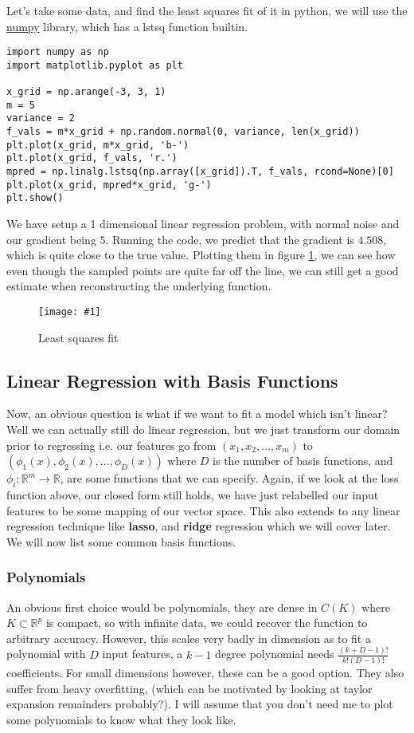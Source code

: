 \documentclass[letterpaper, 12pt]{article}
\def\figinsert#1#2#3{
    \begin{figure}[ht]
    \centering
    \texttt{[image: \#1]}
    \caption{#2}
    \label{#3}
    \end{figure}%
}
\newcommand{\R}{\mathbb{R}}	%
\newcommand{\1}{\mathds{1}}	%
\begin{document}
Let's take some data, and find the least squares fit of it in python, we will use the \href{https://numpy.org/}{numpy} library, which has a lstsq function builtin.
\begin{verbatim}
import numpy as np
import matplotlib.pyplot as plt

x_grid = np.arange(-3, 3, 1)
m = 5
variance = 2
f_vals = m*x_grid + np.random.normal(0, variance, len(x_grid))
plt.plot(x_grid, m*x_grid, 'b-')
plt.plot(x_grid, f_vals, 'r.')
mpred = np.linalg.lstsq(np.array([x_grid]).T, f_vals, rcond=None)[0]
plt.plot(x_grid, mpred*x_grid, 'g-')
plt.show()
\end{verbatim}
We have setup a 1 dimensional linear regression problem, with normal noise and our gradient being \(5\). Running the code, we predict that the gradient is \(4.508\), which is quite close to the true value. Plotting them in figure \ref{fig: lsqplot}, we can see how even though the sampled points are quite far off the line, we can still get a good estimate when reconstructing the underlying function.
\figinsert{python/lecture2/lsqfit.eps}{Least squares fit}{fig: lsqplot}

\subsection{Linear Regression with Basis Functions}
Now, an obvious question is what if we want to fit a model which isn't linear? Well we can actually still do linear regression, but we just transform our domain prior to regressing i.e. our features go from \((x_1, x_2, \ldots, x_m)\) to \((\phi_1(x), \phi_2(x),\ldots, \phi_D(x))\) where \(D\) is the number of basis functions, and \(\phi_i : \R^m \to \R\), are some functions that we can specify. Again, if we look at the loss function above, our closed form still holds, we have just relabelled our input features to be some mapping of our vector space. This also extends to any linear regression technique like \textbf{lasso}, and \textbf{ridge} regression which we will cover later. We will now list some common basis functions.

\subsubsection{Polynomials}
An obvious first choice would be polynomials, they are dense in \(C(K)\) where \(K\subset \R^p\) is compact, so with infinite data, we could recover the function to arbitrary accuracy. However, this scales very badly in dimension as to fit a polynomial with \(D\) input features, a \(k-1\) degree polynomial needs \(\frac{(k+D-1)!}{k!(D-1)!}\) coefficients. For small dimensions however, these can be a good option. They also suffer from heavy overfitting, (which can be motivated by looking at taylor expansion remainders probably?). I will assume that you don't need me to plot some polynomials to know what they look like.
\end{document}
